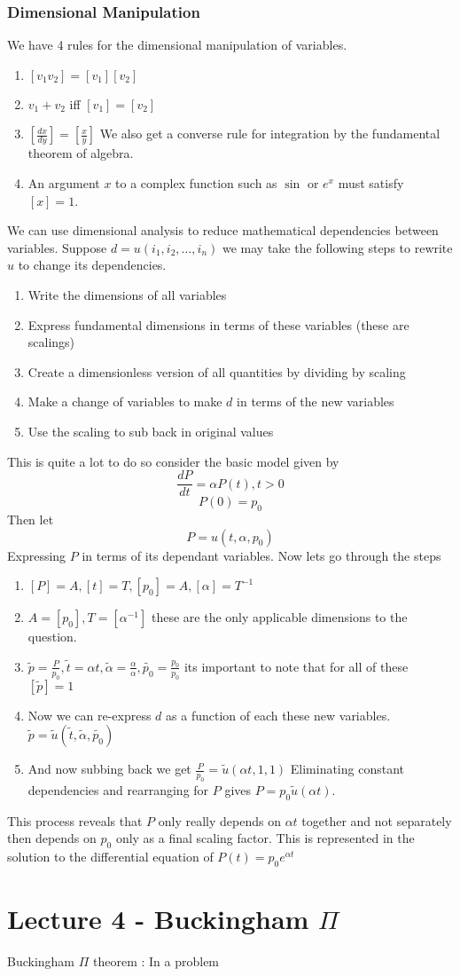 \documentclass{article}
\begin{document}
\subsubsection{Dimensional Manipulation}
We have 4 rules for the dimensional manipulation of variables.
\begin{enumerate}
    \item $[v_1v_2] = [v_1][v_2]$
    \item $v_1 + v_2$ iff $[v_1] = [v_2]$
    \item $\left[\frac{dx}{dy}\right] = \left[\frac{x}{y}\right]$ We also get a converse rule for integration by the fundamental theorem of algebra.
    \item An argument $x$ to a complex function such as $\sin$ or $e^x$ must satisfy $[x] = 1$.
\end{enumerate}
We can use dimensional analysis to reduce mathematical dependencies between variables. Suppose $d = u(i_1,i_2,\dots,i_n)$ we may take the following steps to rewrite $u$ to change its dependencies.
\begin{enumerate}
    \item Write the dimensions of all variables
    \item Express fundamental dimensions in terms of these variables (these are scalings)
    \item Create a dimensionless version of all quantities by dividing by scaling
    \item Make a change of variables to make $d$ in terms of the new variables
    \item Use the scaling to sub back in original values
\end{enumerate}
This is quite a lot to do so consider the basic model given by 
\[\frac{dP}{dt} = \alpha P(t),t>0\]
\[P(0) = p_0\]
Then let 
\[P = u(t,\alpha,p_0)\]
Expressing $P$ in terms of its dependant variables. Now lets go through the steps
\begin{enumerate}
    \item $[P] = A,[t] = T,[p_0] = A,[\alpha] = T^{-1}$
    \item $A = [p_0],T = [\alpha^{-1}]$ these are the only applicable dimensions to the question.
    \item $\tilde{p} = \frac{P}{p_0},\tilde{t} = \alpha t, \tilde{\alpha} = \frac{\alpha}{\alpha},\tilde{p_0} = \frac{p_0}{p_0}$ its important to note that for all of these $[\tilde{p}] = 1$
    \item Now we can re-express $d$ as a function of each these new variables. $\tilde{p} = \tilde{u}(\tilde{t},\tilde{\alpha},\tilde{p_0})$
    \item And now subbing back we get $\frac{P}{p_0} = \tilde{u}(\alpha t,1,1)$ Eliminating constant dependencies and rearranging for $P$ gives $P = p_0\tilde{u}(\alpha t)$.
\end{enumerate}
This process reveals that $P$ only really depends on $\alpha t$ together and not separately then depends on $p_0$ only as a final scaling factor. This is represented in the solution to the differential equation of $P(t) = p_0e^{\alpha t}$
\section{Lecture 4 - Buckingham $\Pi$}
\begin{theorem}
    Buckingham $\Pi$ theorem : In a problem 
\end{theorem}
    
\end{document}
